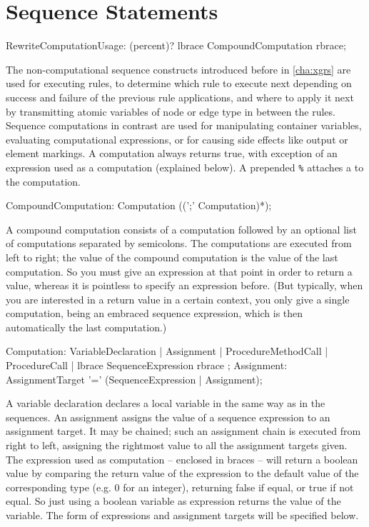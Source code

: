 \section{Sequence Statements} \label{sec:seqcomp}

\begin{rail} 
  RewriteComputationUsage: (percent)? lbrace CompoundComputation rbrace; 
\end{rail}

The non-computational sequence constructs introduced before in \ref{cha:xgrs} are used for executing rules, to determine which rule to execute next depending on success and failure of the previous rule applications, and where to apply it next by transmitting atomic variables of node or edge type in between the rules.
Sequence computations in contrast are used for manipulating container variables, evaluating computational expressions, or for causing side effects like output or element markings.
A computation always returns true, with exception of an expression used as a computation (explained below).
A prepended \texttt{\%} attaches a  to the computation.

\begin{rail} 
  CompoundComputation: Computation ((';' Computation)*); 
\end{rail}

A compound computation consists of a computation followed by an optional list of computations separated by semicolons.
The computations are executed from left to right;
the value of the compound computation is the value of the last computation.
So you must give an expression at that point in order to return a value, 
whereas it is pointless to specify an expression before.
(But typically, when you are interested in a return value in a certain context, you only give a single computation, being an embraced sequence expression, which is then automatically the last computation.)

\begin{rail} 
  Computation:
     VariableDeclaration |
     Assignment |
     ProcedureMethodCall |
     ProcedureCall |
     lbrace SequenceExpression rbrace
  ;
	Assignment:	AssignmentTarget '=' (SequenceExpression | Assignment); 
\end{rail}

A variable declaration declares a local variable in the same way as in the sequences.
An assignment assigns the value of a sequence expression to an assignment target.
It may be chained; such an assignment chain is executed from right to left, assigning the rightmost value to all the assignment targets given.
The expression used as computation -- enclosed in braces -- will return a boolean value by comparing the return value of the expression to the default value of the corresponding type (e.g. 0 for an integer), returning false if equal, or true if not equal.
So just using a boolean variable as expression returns the value of the variable.
The form of expressions and assignment targets will be specified below.

